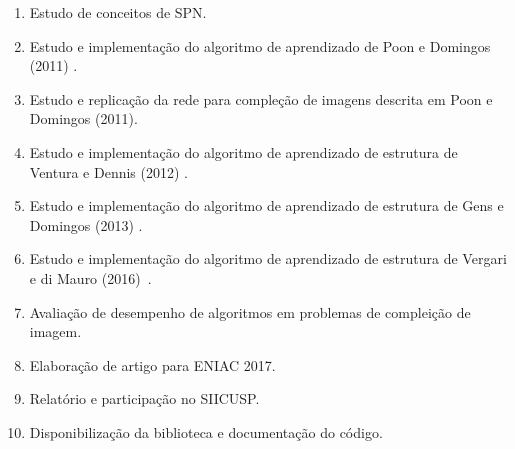 \documentclass[12pt]{article}
\theoremstyle{plain}
\numberwithin{equation}{section}
\begin{document}
\begin{enumerate}[label=\alph*.]
  \item Estudo de conceitos de SPN\@.
  \item Estudo e implementação do algoritmo de aprendizado de Poon e Domingos (2011)
    \cite{poon-domingos}.
  \item Estudo e replicação da rede para compleção de imagens descrita em Poon e Domingos (2011).
  \item Estudo e implementação do algoritmo de aprendizado de estrutura de Ventura e Dennis (2012)
    \cite{greedy-search}.
  \item Estudo e implementação do algoritmo de aprendizado de estrutura de Gens e Domingos (2013)
    \cite{gens-domingos}.
  \item Estudo e implementação do algoritmo de aprendizado de estrutura de Vergari e di Mauro
    (2016)~\cite{vergari-mauro}.
  \item Avaliação de desempenho de algoritmos em problemas de compleição de imagem.
  \item Elaboração de artigo para ENIAC 2017.
  \item Relatório e participação no SIICUSP\@.
  \item Disponibilização da biblioteca e documentação do código.
\end{enumerate}

\printbibliography[]
\end{document}
